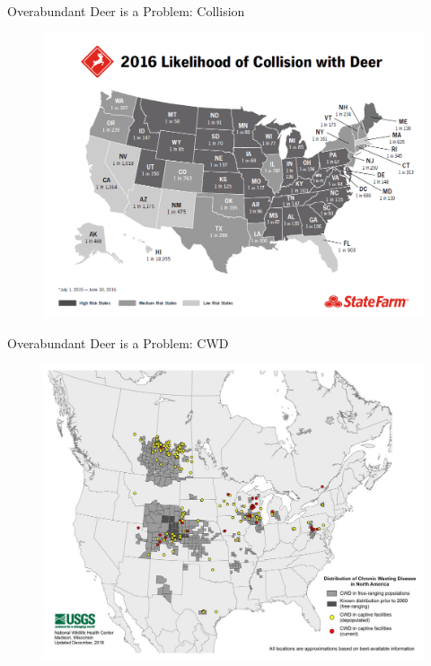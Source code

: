 \documentclass{beamer}
\begin{document}
\begin{frame}{Overabundant Deer is a Problem: Collision}
	\begin{figure}[ht]
		\centering
		\includegraphics[scale=.23]{fig/Chicago_deer/1920_deermap.png}
		\label{deermap}
	\end{figure}
\end{frame}

\begin{frame}{Overabundant Deer is a Problem: CWD}
	\begin{figure}[ht]
		\centering
		\includegraphics[scale=0.8]{fig/Chicago_deer/CWD.jpg}
		\label{cwd}
	\end{figure}
\end{frame}
\end{document}
